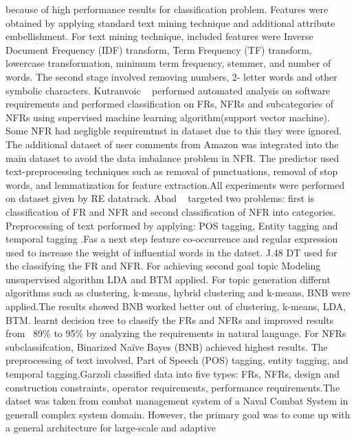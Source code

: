 because of high performance results for classification problem. Features were
obtained by applying standard text mining technique and additional attribute
embellishment. For text mining technique,
included features were Inverse Document Frequency (IDF) transform, Term Frequency (TF) transform, lowercase
transformation, minimum term frequency, stemmer, and number of words. The second stage involved removing numbers, 2- letter words
and other symbolic characters.
Kutranvoic \etal ~ \cite {Kurtanovic:2017}performed automated analysis on
software requirements and performed classification on FRs, NFRs and
subcategories of NFRs using supervised machine learning algorithm(support vector
machine). Some NFR had negligble requiremtnst in dataset due to this they were
ignored. The additional dataset of user comments from Amazon was integrated into
the main dataset to avoid the data imbalance problem in NFR. The predictor used
text-preprocessing techniques such as removal of punctuations, removal of stop
words, and lemmatization for feature extraction.All experiments were performed
on dataset given by RE datatrack.
 Abad \etal ~ \cite{Abad:2017} targeted two problems: first is classification of
 FR and NFR and second classification of NFR into categories. Preprocessing of
 text performed by applying: POS tagging, Entity tagging and temporal tagging
 .Fas a next step feature co-occurrence and regular expression used to increase
 the weight of influential words in the datset.
 J.48 DT used for the classifying the FR and NFR. For achieving second goal topic Modeling unsupervised algorithm
 LDA and BTM applied. For topic generation differnt algorithms such as
 clustering, k-means, hybrid clustering and k-means, BNB were applied.The
 results showed BNB worked better out of clustering, k-means, LDA, BTM.
learnt decision tree to classify the FRs and NFRs and improved results from
~89\% to 95\% by analyzing the requirements in natural language. For NFRs
subclassifcation, Binarized Naïve Bayes (BNB) achieved highest results. The
preprocessing of text involved, Part of Speech (POS) tagging, entity tagging,
and temporal tagging.Garzoli \cite {Garzoli:2013} classified data into five
types: FRs, NFRs, design and construction constraints, operator requirements,
performance requirements.The datset was taken from combat management system of a
Naval Combat System in generall complex system domain. However, the primary goal
was to come up with a general architecture for large-scale and adaptive
